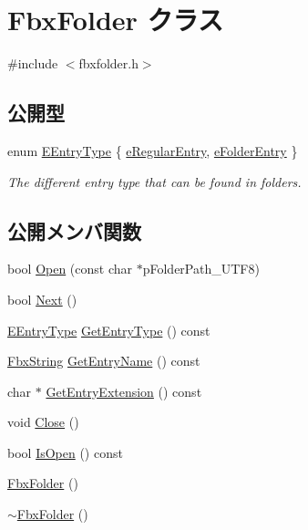 \hypertarget{class_fbx_folder}{}\section{Fbx\+Folder クラス}
\label{class_fbx_folder}


{\ttfamily \#include $<$fbxfolder.\+h$>$}

\subsection*{公開型}
\begin{DoxyCompactItemize}
\item 
enum \hyperlink{class_fbx_folder_aba9ef5b806b138dec254dfe5dedbb719}{E\+Entry\+Type} \{ \hyperlink{class_fbx_folder_aba9ef5b806b138dec254dfe5dedbb719a5e6793b9289c6aecd4cf50a6e19bbee5}{e\+Regular\+Entry}, 
\hyperlink{class_fbx_folder_aba9ef5b806b138dec254dfe5dedbb719a1a78e903f59673df49ba233185e186c9}{e\+Folder\+Entry}
 \}\begin{DoxyCompactList}\small\item\em The different entry type that can be found in folders. \end{DoxyCompactList}
\end{DoxyCompactItemize}
\subsection*{公開メンバ関数}
\begin{DoxyCompactItemize}
\item 
bool \hyperlink{class_fbx_folder_a84cebc4677af006fa464547079e943c2}{Open} (const char $\ast$p\+Folder\+Path\+\_\+\+U\+T\+F8)
\item 
bool \hyperlink{class_fbx_folder_aae7143fd3d6c61581af8d102564c904a}{Next} ()
\item 
\hyperlink{class_fbx_folder_aba9ef5b806b138dec254dfe5dedbb719}{E\+Entry\+Type} \hyperlink{class_fbx_folder_a19057a425782659aeeda901f7888f804}{Get\+Entry\+Type} () const
\item 
\hyperlink{class_fbx_string}{Fbx\+String} \hyperlink{class_fbx_folder_a893ff8805d32ab1c0bf614d07e706c0c}{Get\+Entry\+Name} () const
\item 
char $\ast$ \hyperlink{class_fbx_folder_a380385ead4cacb06613362f988f3634e}{Get\+Entry\+Extension} () const
\item 
void \hyperlink{class_fbx_folder_a43be1ed2f95c3a0876b32b1e89a57c03}{Close} ()
\item 
bool \hyperlink{class_fbx_folder_a350cdc0cd6b8bb625ebb7c4b560f9e45}{Is\+Open} () const
\item 
\hyperlink{class_fbx_folder_aa62f568592036dc48a8d74b212da117c}{Fbx\+Folder} ()
\item 
\hyperlink{class_fbx_folder_a59775e144959137b55f9f7e2eefccfb4}{$\sim$\+Fbx\+Folder} ()
\end{DoxyCompactItemize}



